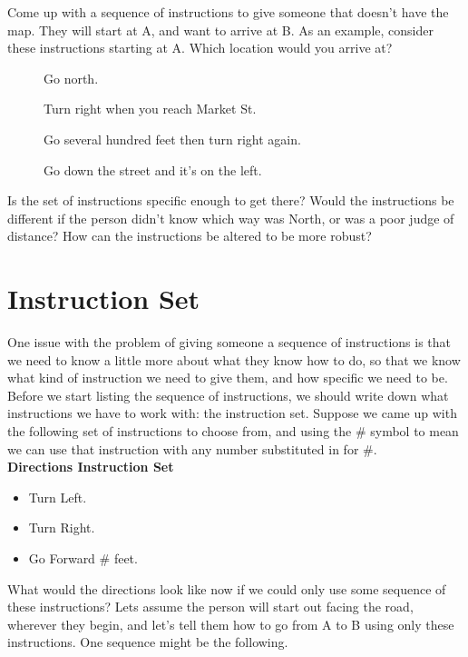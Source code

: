Come up with a sequence of instructions to give someone that doesn't have the map. They will start at A, and want to arrive at B. As an example, consider these instructions starting at A. Which location would you arrive at?

\begin{description}
	\item[] Go north.
	\item[] Turn right when you reach Market St.
	\item[] Go several hundred feet then turn right again.
	\item[] Go down the street and it's on the left.
\end{description}

Is the set of instructions specific enough to get there? Would the instructions be different if the person didn't know which way was North, or was a poor judge of distance? How can the instructions be altered to be more robust?\\

\section{Instruction Set}


One issue with the problem of giving someone a sequence of instructions is that we need to know a little more about what they know how to do, so that we know what kind of instruction we need to give them, and how specific we need to be.\\

Before we start listing the sequence of instructions, we should write down what instructions we have to work with: the instruction set. Suppose we came up with the following set of instructions to choose from, and using the \# symbol to mean we can use that instruction with any number substituted in for \#.\\

\textbf{Directions Instruction Set}
\begin{itemize}
	\item Turn Left.
	\item Turn Right.
	\item Go Forward \# feet.
\end{itemize}
	
What would the directions look like now if we could only use some sequence of these instructions? Lets assume the person will start out facing the road, wherever they begin, and let's tell them how to go from A to B using only these instructions. One sequence might be the following.

